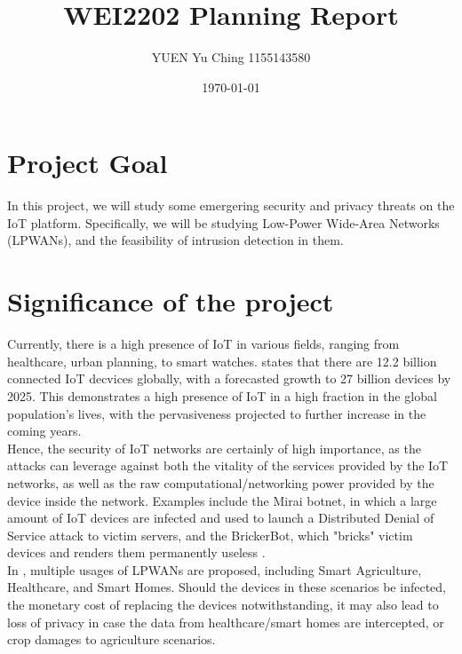 \documentclass{article}
\title{WEI2202 Planning Report}
\author{YUEN Yu Ching 1155143580}
\date{\today}
\begin{document}
\maketitle
\begin{multicols}{2}
\section{Project Goal}
In this project, we will study some emergering security and privacy threats on the IoT platform. Specifically, we will be studying Low-Power Wide-Area Networks (LPWANs), and the feasibility of intrusion detection in them.
\section{Significance of the project}
Currently, there is a high presence of IoT in various fields, ranging from healthcare, urban planning, to smart watches. \cite{hasan.2022} states that there are 12.2 billion connected IoT decvices globally, with a forecasted growth to 27 billion devices by 2025. This demonstrates a high presence of IoT in a high fraction in the global population's lives, with the pervasiveness projected to further increase in the coming years.\\
Hence, the security of IoT networks are certainly of high importance, as the attacks can leverage against both the vitality of the services provided by the IoT networks, as well as the raw computational/networking power provided by the device inside the network. Examples include the Mirai botnet, in which a large amount of IoT devices are infected and used to launch a Distributed Denial of Service attack to victim servers, and the BrickerBot, which "bricks" victim devices and renders them permanently useless \cite{7971869}.\\
In \cite{9753563}, multiple usages of LPWANs are proposed, including Smart Agriculture, Healthcare, and Smart Homes. Should the devices in these scenarios be infected, the monetary cost of replacing the devices notwithstanding, it may also lead to loss of privacy in case the data from healthcare/smart homes are intercepted, or crop damages to agriculture scenarios.


\end{multicols}
\end{document}
